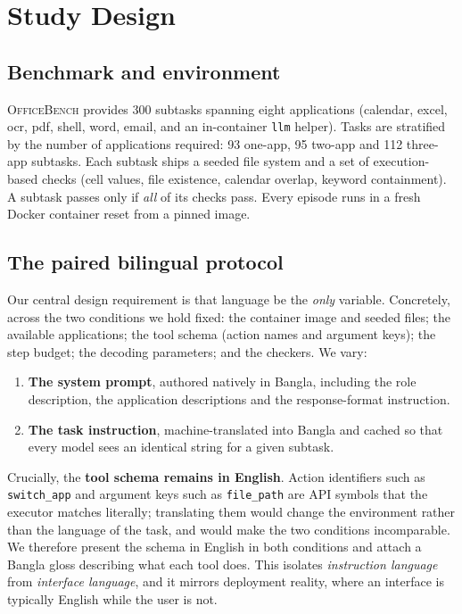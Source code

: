 \documentclass[11pt]{article}
\begin{document}
\section{Study Design}

\subsection{Benchmark and environment}
\textsc{OfficeBench} provides 300 subtasks spanning eight applications (calendar, excel, ocr,
pdf, shell, word, email, and an in-container \texttt{llm} helper). Tasks are stratified by the
number of applications required: 93 one-app, 95 two-app and 112 three-app subtasks. Each
subtask ships a seeded file system and a set of execution-based checks (cell values, file
existence, calendar overlap, keyword containment). A subtask passes only if \emph{all} of its
checks pass. Every episode runs in a fresh Docker container reset from a pinned image.

\subsection{The paired bilingual protocol}
Our central design requirement is that language be the \emph{only} variable. Concretely, across
the two conditions we hold fixed: the container image and seeded files; the available
applications; the tool schema (action names and argument keys); the step budget; the decoding
parameters; and the checkers. We vary:

\begin{enumerate}[noitemsep,topsep=2pt]
\item \textbf{The system prompt}, authored natively in Bangla, including the role description,
the application descriptions and the response-format instruction.
\item \textbf{The task instruction}, machine-translated into Bangla and cached so that every
model sees an identical string for a given subtask.
\end{enumerate}

Crucially, the \textbf{tool schema remains in English}. Action identifiers such as
\texttt{switch\_app} and argument keys such as \texttt{file\_path} are API symbols that the
executor matches literally; translating them would change the environment rather than the
language of the task, and would make the two conditions incomparable. We therefore present the
schema in English in both conditions and attach a Bangla gloss describing what each tool does.
This isolates \emph{instruction language} from \emph{interface language}, and it mirrors
deployment reality, where an interface is typically English while the user is not.
\end{document}
